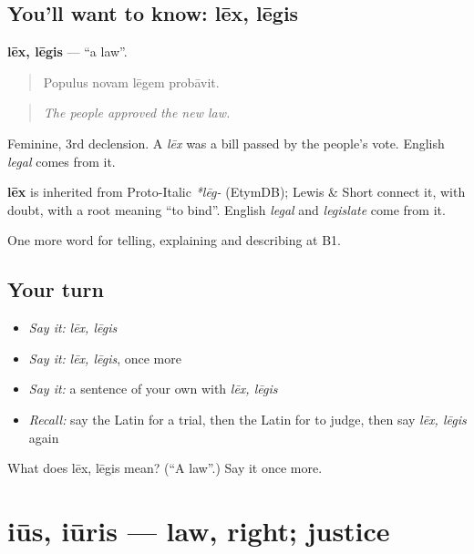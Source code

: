 \subsection*{You'll want to know: lēx, lēgis}
\textbf{lēx, lēgis} — \textquotedblleft{}a law\textquotedblright{}.

\begin{quote}
Populus novam lēgem probāvit.
\end{quote}

\begin{quote}
\emph{The people approved the new law.}
\end{quote}

Feminine, 3rd declension. A \emph{lēx} was a bill passed by the people's vote. English \emph{legal} comes from it.

\begin{cousinweb}
\textbf{lēx} is inherited from Proto-Italic \emph{*lēg-} (EtymDB); Lewis \& Short connect it, with doubt, with a root meaning \textquotedblleft{}to bind\textquotedblright{}. English \emph{legal} and \emph{legislate} come from it.
\end{cousinweb}

\begin{grammarlens}[title={What you've built}]
One more word for telling, explaining and describing at B1.
\end{grammarlens}

\subsection*{Your turn}
\begin{itemize}
\raggedright
  \item \emph{Say it:} \emph{lēx, lēgis}
  \item \emph{Say it:} \emph{lēx, lēgis}, once more
  \item \emph{Say it:} a sentence of your own with \emph{lēx, lēgis}
  \item \emph{Recall:} say the Latin for a trial, then the Latin for to judge, then say \emph{lēx, lēgis} again
\end{itemize}

\begin{tcolorbox}[breakable,colback=teal!4,colframe=teal!35!black,title={Before you move on}]
What does lēx, lēgis mean? (\textquotedblleft{}A law\textquotedblright{}.) Say it once more.
\end{tcolorbox}
\section[iūs, iūris]{iūs, iūris — law, right; justice}

